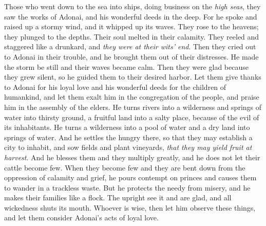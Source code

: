 \begin{biblechapter}
\verse Those who went down to the sea into ships, 
doing business on the \textit{high seas},
\verse they saw the works of Adonai, 
and his wonderful deeds in the deep.
\verse For he spoke and raised up a stormy wind, 
and it whipped up its waves.
\verse They rose to the heavens; they plunged to the depths. 
Their soul melted in their calamity.
\verse They reeled and staggered like a drunkard, 
and \textit{they were at their wits’ end}.
\verse Then they cried out to Adonai in their trouble, 
and he brought them out of their distresses.
\verse He made the storm be still 
and their waves became calm.
\verse Then they were glad because they grew silent, 
so he guided them to their desired harbor.
\verse Let them give thanks to Adonai for his loyal love 
and his wonderful deeds for the children of humankind,
\verse and let them exalt him in the congregation of the people, 
and praise him in the assembly of the elders.
\verse He turns rivers into a wilderness 
and springs of water into thirsty ground,
\verse a fruitful land into a salty place, 
because of the evil of its inhabitants.
\verse He turns a wilderness into a pool of water 
and a dry land into springs of water.
\verse And he settles the hungry there, 
so that they may establish a city to inhabit,
\verse and sow fields and plant vineyards, 
\textit{that they may yield fruit at harvest}.
\verse And he blesses them and they multiply greatly, 
and he does not let their cattle become few.
\verse When they become few and they are bent down 
from the oppression of calamity and grief,
\verse he pours contempt on princes 
and causes them to wander in a trackless waste.
\verse But he protects the needy from misery, 
and he makes their families like a flock.
\verse The upright see it and are glad, 
and all wickedness shuts its mouth.
\verse Whoever is wise, then let him observe these things, 
and let them consider Adonai’s acts of loyal love.
\end{biblechapter}

